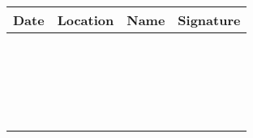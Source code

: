 \documentclass{article}
\begin{document}
\begin{tabularx}{\textwidth}{|X|X|X|X|}
    \hline
    \rowcolor{tableHeaderColor} 
    \begin{minipage}[t]{\linewidth}
        \textbf{Date} 
    \end{minipage}
    & 
    \textbf{Location} 
    & 
    \textbf{Name} 
    & 
    \textbf{Signature} 
    \\ \hline
    & & & \\ \hline
    & & & \\ \hline
    & & & \\ \hline
    & & & \\ \hline
    & & & \\ \hline
    & & & \\ \hline
    & & & \\ \hline
    & & & \\ \hline
    & & & \\ \hline
    & & & \\ \hline
    & & & \\ \hline
    & & & \\ \hline
    & & & \\ \hline
    & & & \\ \hline
    & & & \\ \hline
    & & & \\ \hline
    & & & \\ \hline
    & & & \\ \hline
    & & & \\ \hline
    & & & \\ \hline
\end{tabularx}
\end{document}
